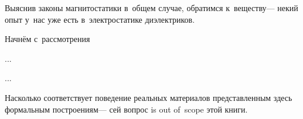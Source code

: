 
\begin{otherlanguage}{russian}

Выяснив законы магнитостатики в~общем случае, обратимся к~веществу\:--- некий опыт у~нас уже есть в~электростатике ди\-элект\-ри\-ков.

Начнём с~рассмотрения

...



...

Насколько соответствует поведение реальных материалов представленным здесь формальным построениям\:--- сей вопрос is out of~scope этой книги.

\end{otherlanguage}



